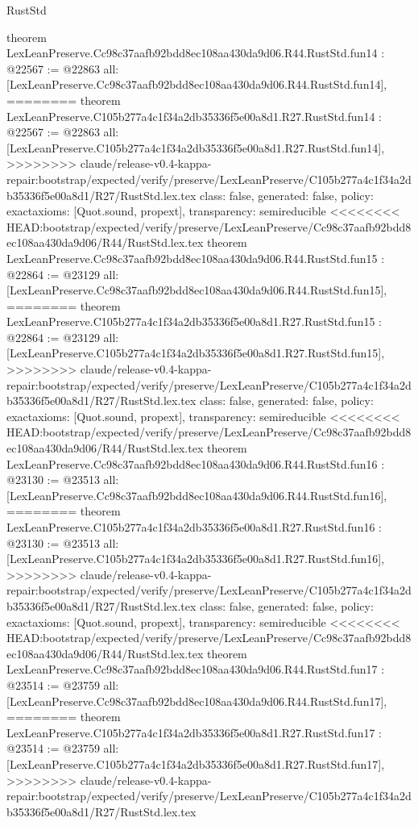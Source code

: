 \begin{lexlean}{RustStd}
\begin{coremodule}
{\begin{coremodule}
{{{{{{{{{{{{{{{{theorem LexLeanPreserve.Cc98c37aafb92bdd8ec108aa430da9d06.R44.RustStd.fun14 : @22567 := @22863 {
  all: [LexLeanPreserve.Cc98c37aafb92bdd8ec108aa430da9d06.R44.RustStd.fun14],
========
theorem LexLeanPreserve.C105b277a4c1f34a2db35336f5e00a8d1.R27.RustStd.fun14 : @22567 := @22863 {
  all: [LexLeanPreserve.C105b277a4c1f34a2db35336f5e00a8d1.R27.RustStd.fun14],
>>>>>>>> claude/release-v0.4-kappa-repair:bootstrap/expected/verify/preserve/LexLeanPreserve/C105b277a4c1f34a2db35336f5e00a8d1/R27/RustStd.lex.tex
  class: false,
  generated: false,
  policy: exact{axioms: [Quot.sound, propext]},
  transparency: semireducible
}
<<<<<<<< HEAD:bootstrap/expected/verify/preserve/LexLeanPreserve/Cc98c37aafb92bdd8ec108aa430da9d06/R44/RustStd.lex.tex
theorem LexLeanPreserve.Cc98c37aafb92bdd8ec108aa430da9d06.R44.RustStd.fun15 : @22864 := @23129 {
  all: [LexLeanPreserve.Cc98c37aafb92bdd8ec108aa430da9d06.R44.RustStd.fun15],
========
theorem LexLeanPreserve.C105b277a4c1f34a2db35336f5e00a8d1.R27.RustStd.fun15 : @22864 := @23129 {
  all: [LexLeanPreserve.C105b277a4c1f34a2db35336f5e00a8d1.R27.RustStd.fun15],
>>>>>>>> claude/release-v0.4-kappa-repair:bootstrap/expected/verify/preserve/LexLeanPreserve/C105b277a4c1f34a2db35336f5e00a8d1/R27/RustStd.lex.tex
  class: false,
  generated: false,
  policy: exact{axioms: [Quot.sound, propext]},
  transparency: semireducible
}
<<<<<<<< HEAD:bootstrap/expected/verify/preserve/LexLeanPreserve/Cc98c37aafb92bdd8ec108aa430da9d06/R44/RustStd.lex.tex
theorem LexLeanPreserve.Cc98c37aafb92bdd8ec108aa430da9d06.R44.RustStd.fun16 : @23130 := @23513 {
  all: [LexLeanPreserve.Cc98c37aafb92bdd8ec108aa430da9d06.R44.RustStd.fun16],
========
theorem LexLeanPreserve.C105b277a4c1f34a2db35336f5e00a8d1.R27.RustStd.fun16 : @23130 := @23513 {
  all: [LexLeanPreserve.C105b277a4c1f34a2db35336f5e00a8d1.R27.RustStd.fun16],
>>>>>>>> claude/release-v0.4-kappa-repair:bootstrap/expected/verify/preserve/LexLeanPreserve/C105b277a4c1f34a2db35336f5e00a8d1/R27/RustStd.lex.tex
  class: false,
  generated: false,
  policy: exact{axioms: [Quot.sound, propext]},
  transparency: semireducible
}
<<<<<<<< HEAD:bootstrap/expected/verify/preserve/LexLeanPreserve/Cc98c37aafb92bdd8ec108aa430da9d06/R44/RustStd.lex.tex
theorem LexLeanPreserve.Cc98c37aafb92bdd8ec108aa430da9d06.R44.RustStd.fun17 : @23514 := @23759 {
  all: [LexLeanPreserve.Cc98c37aafb92bdd8ec108aa430da9d06.R44.RustStd.fun17],
========
theorem LexLeanPreserve.C105b277a4c1f34a2db35336f5e00a8d1.R27.RustStd.fun17 : @23514 := @23759 {
  all: [LexLeanPreserve.C105b277a4c1f34a2db35336f5e00a8d1.R27.RustStd.fun17],
>>>>>>>> claude/release-v0.4-kappa-repair:bootstrap/expected/verify/preserve/LexLeanPreserve/C105b277a4c1f34a2db35336f5e00a8d1/R27/RustStd.lex.tex
}}}}}}}}}}}}}}}}}}}}}
\end{coremodule}}
\end{coremodule}
\end{lexlean}
